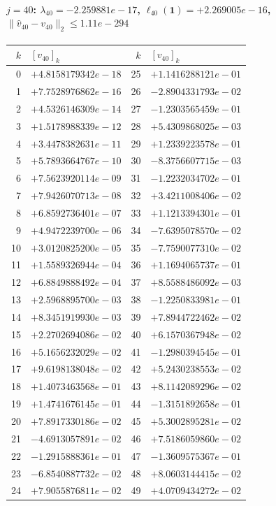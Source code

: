 \paragraph{$j = 40$: $\lambda_{40} = -2.259881e-17$, \quad $\ell_{40}(\mathbf{1}) = +2.269005e-16$, \quad $\|\hat{v}_{40} - v_{40}\|_2 \leq 1.11e-294$}
\begin{center}
{\footnotesize
\begin{tabular}{r@{\;\;}l@{\quad}r@{\;\;}l}
\toprule
$k$ & $[v_{40}]_k$ & $k$ & $[v_{40}]_k$ \\
\midrule
0 & $+4.8158179342e-18$ & 25 & $+1.1416288121e-01$ \\
1 & $+7.7528976862e-16$ & 26 & $-2.8904331793e-02$ \\
2 & $+4.5326146309e-14$ & 27 & $-1.2303565459e-01$ \\
3 & $+1.5178988339e-12$ & 28 & $+5.4309868025e-03$ \\
4 & $+3.4478382631e-11$ & 29 & $+1.2339223578e-01$ \\
5 & $+5.7893664767e-10$ & 30 & $-8.3756607715e-03$ \\
6 & $+7.5623920114e-09$ & 31 & $-1.2232034702e-01$ \\
7 & $+7.9426070713e-08$ & 32 & $+3.4211008406e-02$ \\
8 & $+6.8592736401e-07$ & 33 & $+1.1213394301e-01$ \\
9 & $+4.9472239700e-06$ & 34 & $-7.6395078570e-02$ \\
10 & $+3.0120825200e-05$ & 35 & $-7.7590077310e-02$ \\
11 & $+1.5589326944e-04$ & 36 & $+1.1694065737e-01$ \\
12 & $+6.8849888492e-04$ & 37 & $+8.5588486092e-03$ \\
13 & $+2.5968895700e-03$ & 38 & $-1.2250833981e-01$ \\
14 & $+8.3451919930e-03$ & 39 & $+7.8944722462e-02$ \\
15 & $+2.2702694086e-02$ & 40 & $+6.1570367948e-02$ \\
16 & $+5.1656232029e-02$ & 41 & $-1.2980394545e-01$ \\
17 & $+9.6198138048e-02$ & 42 & $+5.2430238553e-02$ \\
18 & $+1.4073463568e-01$ & 43 & $+8.1142089296e-02$ \\
19 & $+1.4741676145e-01$ & 44 & $-1.3151892658e-01$ \\
20 & $+7.8917330186e-02$ & 45 & $+5.3002895281e-02$ \\
21 & $-4.6913057891e-02$ & 46 & $+7.5186059860e-02$ \\
22 & $-1.2915888361e-01$ & 47 & $-1.3609575367e-01$ \\
23 & $-6.8540887732e-02$ & 48 & $+8.0603144415e-02$ \\
24 & $+7.9055876811e-02$ & 49 & $+4.0709434272e-02$ \\
\bottomrule
\end{tabular}
}
\end{center}

